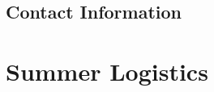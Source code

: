 \documentclass[a4paper,12pt,onecolumn]{article}
\begin{document}

\subsection{Contact Information} %
\label{ssub:contact_information}


\section{Summer Logistics} %
\label{sec:summer_logistics}




\end{document}
